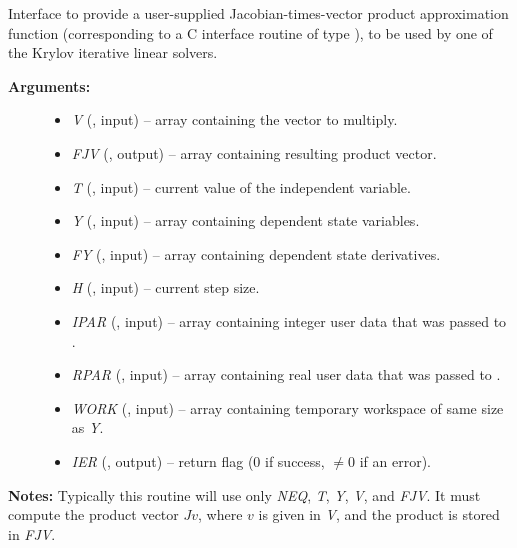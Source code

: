 \documentclass[letterpaper,10pt,english]{sphinxmanual}
\begin{document}
\begin{fulllineitems}
\label{f_interface/Usage:f/_/FARKJTIMES}
Interface to provide a user-supplied Jacobian-times-vector product
approximation function (corresponding to a C interface routine of
type {\hyperref[c_interface/User_supplied:c.ARKSpilsJacTimesVecFn]{\emph{}}}), to be used by one of the
Krylov iterative linear solvers.
\begin{description}
\item[{\textbf{Arguments:}}] \leavevmode\begin{itemize}
\item {} 
\emph{V}    (, input) -- array containing the vector to multiply.

\item {} 
\emph{FJV}  (, output) -- array containing resulting product vector.

\item {} 
\emph{T}    (, input) -- current value of the independent variable.

\item {} 
\emph{Y}    (, input) -- array containing dependent state variables.

\item {} 
\emph{FY}   (, input) -- array containing dependent state derivatives.

\item {} 
\emph{H}    (, input) -- current step size.

\item {} 
\emph{IPAR} (, input) -- array containing integer user data that was passed to
{\hyperref[f_interface/Usage:f/_/FARKMALLOC]{\emph{}}}.

\item {} 
\emph{RPAR} (, input) -- array containing real user data that was passed to
{\hyperref[f_interface/Usage:f/_/FARKMALLOC]{\emph{}}}.

\item {} 
\emph{WORK} (, input) -- array containing temporary workspace of same size as
\emph{Y}.

\item {} 
\emph{IER}  (, output) -- return flag  (0 if success, \(\ne 0\) if an error).

\end{itemize}

\end{description}

\textbf{Notes:}
Typically this routine will use only \emph{NEQ}, \emph{T}, \emph{Y}, \emph{V}, and
\emph{FJV}.  It must compute the product vector \(Jv\), where
\(v\) is given in \emph{V}, and the product is stored in \emph{FJV}.

\end{fulllineitems}
\end{document}
